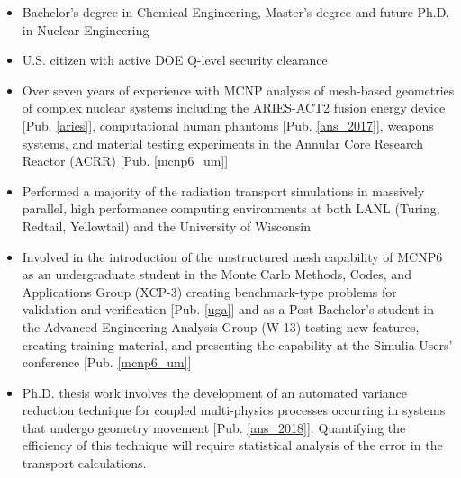 \begin{center}
\begin{minipage}{\textwidth}
\begin{itemize}[leftmargin=.875in,rightmargin=.875in,itemsep=1.0mm]
               \item Bachelor's degree in Chemical Engineering, Master's degree
		       and future Ph.D. in Nuclear Engineering
               \item U.S. citizen with active DOE Q-level security clearance 
                \item Over seven years of experience with MCNP analysis of
			mesh-based geometries of complex nuclear
		      systems including the ARIES-ACT2 fusion energy device
		      [Pub. \ref{aries}],
		      computational human phantoms
		      [Pub. \ref{ans_2017}], weapons systems, and material testing
		      experiments in the
		      Annular Core Research Reactor (ACRR) [Pub.
		      \ref{mcnp6_um}]
               \item Performed a majority of the radiation transport simulations 
                     in massively parallel, high performance computing 
                     environments at both LANL (Turing, Redtail, Yellowtail) 
                     and the University of Wisconsin 
	       \item Involved in the introduction of the unstructured mesh capability
                     of MCNP6 as an undergraduate student in the Monte Carlo Methods, 
                     Codes, and Applications Group (XCP-3)
                     creating benchmark-type problems for validation and
		     verification [Pub. \ref{uga}] and as a Post-Bachelor's 
                     student in the Advanced Engineering Analysis Group (W-13) 
                     testing new features, creating training material, and 
                     presenting the capability at the Simulia Users' conference
                     [Pub. \ref{mcnp6_um}]
	       \item Ph.D. thesis work involves the development of an automated variance reduction technique for
		       coupled multi-physics processes occurring in 
		       systems that undergo geometry movement
                       [Pub. \ref{ans_2018}].  
                       Quantifying the efficiency of this technique will require
                       statistical analysis of the error in the transport calculations.

\end{itemize}
\end{minipage}
\end{center}
